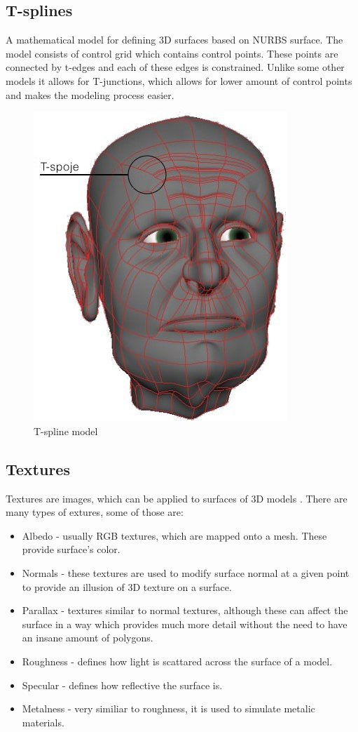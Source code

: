 \documentclass[12pt,a4paper,titlepage,final]{report}
\begin{document}
\subsection{T-splines}
A mathematical model for defining 3D surfaces based on NURBS surface. The model consists of control grid which contains control points. These points are connected by t-edges and each of these edges is constrained. Unlike some other models it allows for T-junctions, which allows for lower amount of control points and makes the modeling process easier. \cite{sederberg_zheng_bakenov_nasri_2003}

\begin{figure}[H]
    \centering
    \includegraphics{images/tsplines.jpg}
    \caption{T-spline model \cite{tsplines}}
    \label{fig:tsplines}
\end{figure}

\subsection{Textures}
Textures are images, which can be applied to surfaces of 3D models \cite{wang}. There are many types of extures, some of those are:

\begin{itemize}
    \item Albedo - usually RGB textures, which are mapped onto a mesh. These provide surface's color.
    \item Normals - these textures are used to modify surface normal at a given point to provide an illusion of 3D texture on a surface.
    \item Parallax - textures similar to normal textures, although these can affect the surface in a way which provides much more detail without the need to have an insane amount of polygons. 
    \item Roughness - defines how light is scattared across the surface of a model. 
    \item Specular - defines how reflective the surface is.
    \item Metalness - very similiar to roughness, it is used to simulate metalic materials.
\end{itemize}
\end{document}
